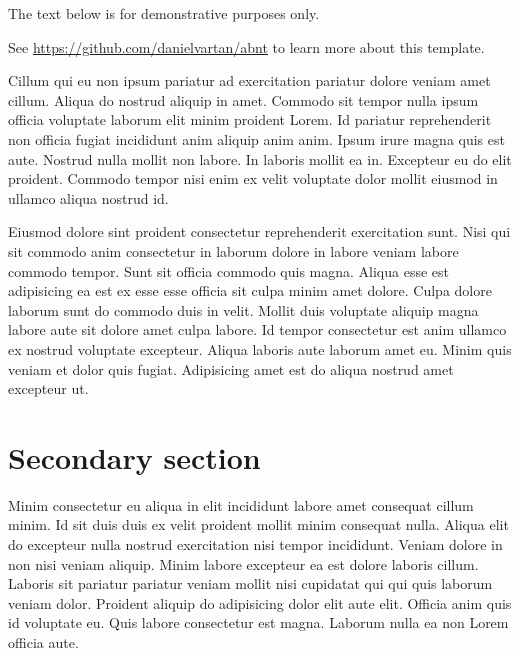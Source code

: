\documentclass[
12pt,
openright,
oneside,
a4paper,
chapter=TITLE,
section=TITLE,
french,
spanish,
brazil,
english
]{abntex2}\usepackage{array}
\begin{document}
\begin{tcolorbox}[enhanced jigsaw, left=2mm, coltitle=black, breakable, bottomrule=.15mm, colbacktitle=quarto-callout-important-color!10!white, opacitybacktitle=0.6, arc=.35mm, leftrule=.75mm, titlerule=0mm, rightrule=.15mm, colframe=quarto-callout-important-color-frame, toprule=.15mm, title=\textcolor{quarto-callout-important-color}{\faExclamation}\hspace{0.5em}{Important}, opacityback=0, toptitle=1mm, colback=white, bottomtitle=1mm]

The text below is for demonstrative purposes only.

\vspace{0.25\baselineskip}

See \url{https://github.com/danielvartan/abnt} to learn more about this
template.

\end{tcolorbox}

Cillum qui eu non ipsum pariatur ad exercitation pariatur dolore veniam
amet cillum. Aliqua do nostrud aliquip in amet. Commodo sit tempor nulla
ipsum officia voluptate laborum elit minim proident Lorem. Id pariatur
reprehenderit non officia fugiat incididunt anim aliquip anim anim.
Ipsum irure magna quis est aute. Nostrud nulla mollit non labore. In
laboris mollit ea in. Excepteur eu do elit proident. Commodo tempor nisi
enim ex velit voluptate dolor mollit eiusmod in ullamco aliqua nostrud
id.

Eiusmod dolore sint proident consectetur reprehenderit exercitation
sunt. Nisi qui sit commodo anim consectetur in laborum dolore in labore
veniam labore commodo tempor. Sunt sit officia commodo quis magna.
Aliqua esse est adipisicing ea est ex esse esse officia sit culpa minim
amet dolore. Culpa dolore laborum sunt do commodo duis in velit. Mollit
duis voluptate aliquip magna labore aute sit dolore amet culpa labore.
Id tempor consectetur est anim ullamco ex nostrud voluptate excepteur.
Aliqua laboris aute laborum amet eu. Minim quis veniam et dolor quis
fugiat. Adipisicing amet est do aliqua nostrud amet excepteur ut.

\hypertarget{secondary-section-2}{%
\section{Secondary section}\label{secondary-section-2}}

Minim consectetur eu aliqua in elit incididunt labore amet consequat
cillum minim. Id sit duis duis ex velit proident mollit minim consequat
nulla. Aliqua elit do excepteur nulla nostrud exercitation nisi tempor
incididunt. Veniam dolore in non nisi veniam aliquip. Minim labore
excepteur ea est dolore laboris cillum. Laboris sit pariatur pariatur
veniam mollit nisi cupidatat qui qui quis laborum veniam dolor. Proident
aliquip do adipisicing dolor elit aute elit. Officia anim quis id
voluptate eu. Quis labore consectetur est magna. Laborum nulla ea non
Lorem officia aute.
\end{document}
